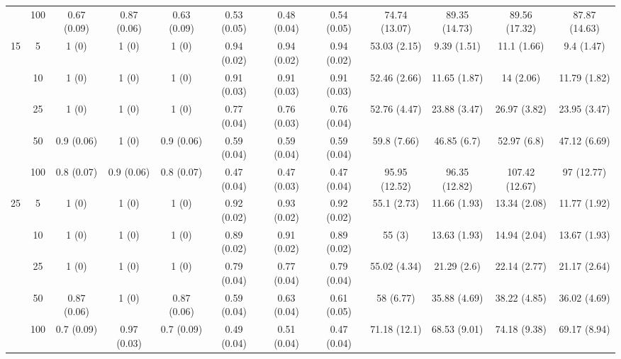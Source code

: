 \documentclass[11pt]{article}
\theoremstyle{definition}
\begin{document}
\begin{table}[H]
\begin{center}
{\begin{tabular}{cc|ccc|ccc|cccc|}
    & 100  & 0.67 (0.09) & 0.87 (0.06) & 0.63 (0.09) & 0.53 (0.05) & 0.48 (0.04) & 0.54 (0.05) & 74.74 (13.07) & 89.35 (14.73) & 89.56 (17.32) & 87.87 (14.63)\\[.3cm]
    \multirow{5}{*}{15}  & 5  & 1 (0) & 1 (0) & 1 (0) & 0.94 (0.02) & 0.94 (0.02) & 0.94 (0.02) & 53.03 (2.15) & 9.39 (1.51) & 11.1 (1.66) & 9.4 (1.47) \\ 
    & 10  & 1 (0) & 1 (0) & 1 (0) & 0.91 (0.03) & 0.91 (0.03) & 0.91 (0.03) & 52.46 (2.66) & 11.65 (1.87) & 14 (2.06) & 11.79 (1.82) \\ 
    & 25  & 1 (0) & 1 (0) & 1 (0) & 0.77 (0.04) & 0.76 (0.03) & 0.76 (0.04) & 52.76 (4.47) & 23.88 (3.47) & 26.97 (3.82) & 23.95 (3.47) \\ 
    & 50  & 0.9 (0.06) & 1 (0) & 0.9 (0.06) & 0.59 (0.04) & 0.59 (0.04) & 0.59 (0.04) & 59.8 (7.66) & 46.85 (6.7) & 52.97 (6.8) & 47.12 (6.69) \\ 
    & 100  & 0.8 (0.07) & 0.9 (0.06) & 0.8 (0.07) & 0.47 (0.04) & 0.47 (0.03) & 0.47 (0.04) & 95.95 (12.52) & 96.35 (12.82) & 107.42 (12.67) & 97 (12.77) \\[.3cm]
    \multirow{5}{*}{25}  & 5  & 1 (0) & 1 (0) & 1 (0) & 0.92 (0.02) & 0.93 (0.02) & 0.92 (0.02) & 55.1 (2.73) & 11.66 (1.93) & 13.34 (2.08) & 11.77 (1.92) \\ 
    & 10  & 1 (0) & 1 (0) & 1 (0) & 0.89 (0.02) & 0.91 (0.02) & 0.89 (0.02) & 55 (3) & 13.63 (1.93) & 14.94 (2.04) & 13.67 (1.93) \\ 
    & 25  & 1 (0) & 1 (0) & 1 (0) & 0.79 (0.04) & 0.77 (0.04) & 0.79 (0.04) & 55.02 (4.34) & 21.29 (2.6) & 22.14 (2.77) & 21.17 (2.64) \\ 
    & 50  & 0.87 (0.06) & 1 (0) & 0.87 (0.06) & 0.59 (0.04) & 0.63 (0.04) & 0.61 (0.05) & 58 (6.77) & 35.88 (4.69) & 38.22 (4.85) & 36.02 (4.69) \\ 
    & 100  & 0.7 (0.09) & 0.97 (0.03) & 0.7 (0.09) & 0.49 (0.04) & 0.51 (0.04) & 0.47 (0.04) & 71.18 (12.1) & 68.53 (9.01) & 74.18 (9.38) & 69.17 (8.94) \\ 
\end{tabular}}
   \end{center}
      \vspace{-.5cm}
\end{table}
\end{document}

